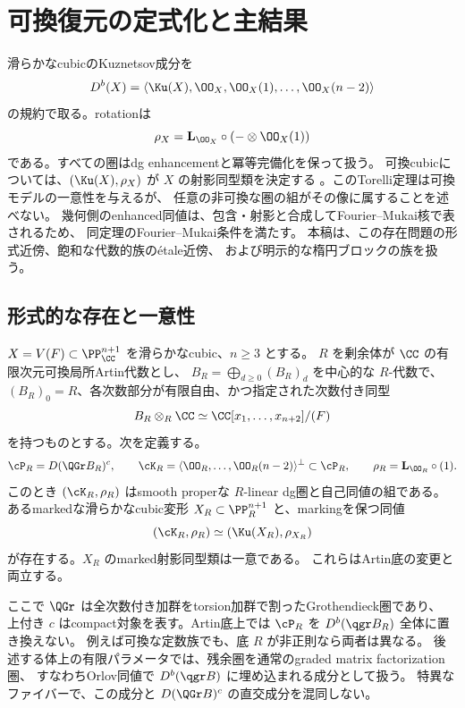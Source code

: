 \section{可換復元の定式化と主結果}\label{sec:intro}

滑らかなcubicのKuznetsov成分を
\[
 D^b(X)=\langle\Ku(X),\OO_X,\OO_X(1),\ldots,\OO_X(n-2)\rangle
\]
の規約で取る。rotationは
\[
 \rho_X=\mathbf L_{\OO_X}\circ(-\otimes\OO_X(1))
\]
である。すべての圏はdg enhancementと冪等完備化を保って扱う。
可換cubicについては、\((\Ku(X),\rho_X)\) が \(X\) の射影同型類を決定する
\cite[Theorem 1.7]{LZ}。このTorelli定理は可換モデルの一意性を与えるが、
任意の非可換な圏の組がその像に属することを述べない。
幾何側のenhanced同値は、包含・射影と合成してFourier--Mukai核で表されるため、
同定理のFourier--Mukai条件を満たす。
本稿は、この存在問題の形式近傍、飽和な代数的族のétale近傍、
および明示的な楕円ブロックの族を扱う。

\subsection{形式的な存在と一意性}

\begin{theorem}[次数付き変形の形式的可換モデル]\label{thm:main}
 \(X=V(F)\subset\PP^{n+1}_{\CC}\) を滑らかなcubic、\(n\ge3\) とする。
 \(R\) を剰余体が \(\CC\) の有限次元可換局所Artin代数とし、
 \(B_R=\bigoplus_{d\ge0}(B_R)_d\) を中心的な \(R\)-代数で、
 \((B_R)_0=R\)、各次数部分が有限自由、かつ指定された次数付き同型
 \[
 B_R\otimes_R\CC\simeq\CC[x_1,\ldots,x_{n+2}]/(F)
 \]
 を持つものとする。次を定義する。
 \[
 \cP_R=D(\QGr B_R)^c,\qquad
 \cK_R=\langle\OO_R,\ldots,\OO_R(n-2)\rangle^\perp\subset\cP_R,\qquad
 \rho_R=\mathbf L_{\OO_R}\circ(1).
 \]
 このとき \((\cK_R,\rho_R)\) はsmooth properな \(R\)-linear dg圏と自己同値の組である。
 あるmarkedな滑らかなcubic変形
 \(X_R\subset\PP^{n+1}_R\) と、markingを保つ同値
 \[
 (\cK_R,\rho_R)\simeq(\Ku(X_R),\rho_{X_R})
 \]
 が存在する。\(X_R\) のmarked射影同型類は一意である。
 これらはArtin底の変更と両立する。
\end{theorem}

ここで \(\QGr\) は全次数付き加群をtorsion加群で割ったGrothendieck圏であり、
上付き \(c\) はcompact対象を表す。Artin底上では
\(\cP_R\) を \(D^b(\qgr B_R)\) 全体に置き換えない。
例えば可換な定数族でも、底 \(R\) が非正則なら両者は異なる。
後述する体上の有限パラメータでは、残余圏を通常のgraded matrix factorization圏、
すなわちOrlov同値で \(D^b(\qgr B)\) に埋め込まれる成分として扱う。
特異なファイバーで、この成分と \(D(\QGr B)^c\) の直交成分を混同しない。

